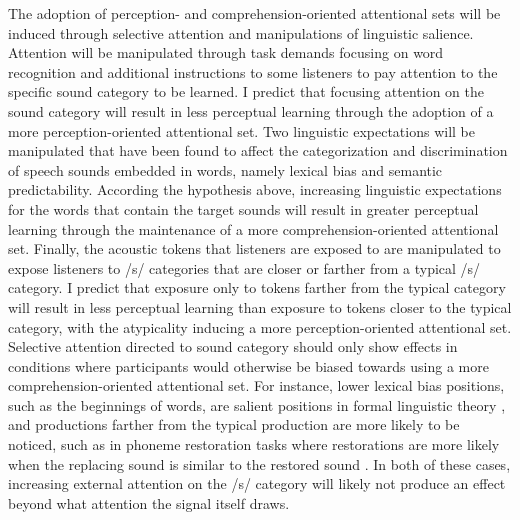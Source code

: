 The adoption of perception- and comprehension-oriented attentional sets will be induced through selective attention and manipulations of linguistic salience.
Attention will be manipulated through task demands focusing on word recognition and additional instructions to some listeners to pay attention to the specific sound category to be learned.
I predict that focusing attention on the sound category will result in less perceptual learning through the adoption of a more perception-oriented attentional set.
Two linguistic expectations will be manipulated that have been found to affect the categorization and discrimination of speech sounds embedded in words, namely lexical bias and semantic predictability.
According the hypothesis above, increasing linguistic expectations for the words that contain the target sounds will result in greater perceptual learning through the maintenance of a more comprehension-oriented attentional set.
Finally, the acoustic tokens that listeners are exposed to are manipulated to expose listeners to /s/ categories that are closer or farther from a typical /s/ category.
I predict that exposure only to tokens farther from the typical category will result in less perceptual learning than exposure to tokens closer to the typical category, with the atypicality inducing a more perception-oriented attentional set.
Selective attention directed to sound category should only show effects in conditions where participants would otherwise be biased towards using a more comprehension-oriented attentional set.
For instance, lower lexical bias positions, such as the beginnings of words, are salient positions in formal linguistic theory \citep{Beckman1998}, and productions farther from the typical production are more likely to be noticed, such as in phoneme restoration tasks where restorations are more likely when the replacing sound is similar to the restored sound \citep{Samuel1981}.
In both of these cases, increasing external attention on the /s/ category will likely not produce an effect beyond what attention the signal itself draws.


